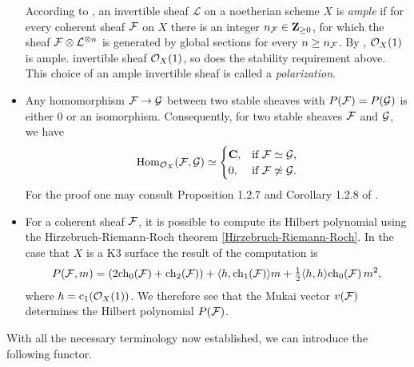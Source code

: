 \begin{itemize}[label = $\vartriangleright$]
{{            According to \cite[\S II.7]{Hartshorne1977}, an invertible sheaf $\mathcal L$ on a noetherian scheme $X$ is \emph{ample} if for every coherent sheaf $\mathcal F$ on $X$ there is an integer $n_\mathcal F \in \mathbf Z_{\geq 0}$, for which the sheaf $\mathcal F \otimes \mathcal L^{\otimes n}$ is generated by global sections for every $n \geq n_\mathcal F$. By \cite[\S II, Example 7.6.1]{Hartshorne1977}, ${\mathcal{O}_{X}}(1)$ is ample. 
        } invertible sheaf ${\mathcal{O}_{X}}(1)$, so does the stability requirement above. This choice of an ample invertible sheaf is called a \emph{polarization}.
    }
    \item{
        Any homomorphism $\mathcal F \to \mathcal G$ between two stable sheaves with $P(\mathcal F) = P(\mathcal G)$ is either $0$ or an isomorphism. Consequently, for two stable sheaves $\mathcal F$ and $\mathcal G$, we have
        \begin{equation}
            \label{eq: schur lemma for stable sheaves}
            \operatorname{Hom}_{{\mathcal{O}_{X}}}(\mathcal F, \mathcal G) \simeq \begin{cases}
                \mathbf C, &\text{if $\mathcal F \simeq \mathcal G$,} \\
                0, &\text{if $\mathcal F \not\simeq \mathcal G$.}
            \end{cases}
        \end{equation}
        For the proof one may consult Proposition 1.2.7 and Corollary 1.2.8 of \cite[Part I, \S 1.2]{HuybrechtsLehn2010}.
    }
    \item{
        For a coherent sheaf $\mathcal F$, it is possible to compute its Hilbert polynomial using the Hirzebruch-Riemann-Roch theorem \ref{Hirzebruch-Riemann-Roch}. In the case that $X$ is a K3 surface the result of the computation is
        \[
            P(\F, m) = (2\ch[0](\F) + \ch[2](\F)) + \pairing{h}{\ch[1](\F)}m + \tfrac{1}{2}\pairing{h}{h}\ch[0]{\F}m^2,
        \]
        where $h = \cclass[1](\struct{X}(1))$. We therefore see that the Mukai vector $v(\mathcal F)$ determines the Hilbert polynomial $P(\mathcal F)$. 
    }
\end{itemize}

\noindent
With all the necessary terminology now established, we can introduce the following functor. 

